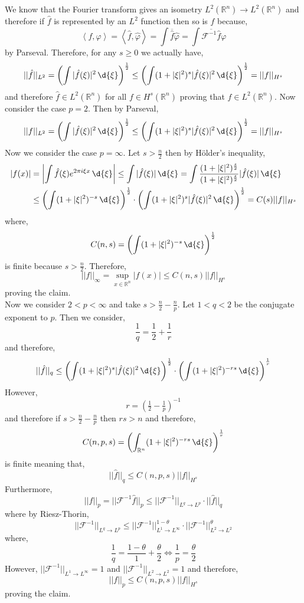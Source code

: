 \documentclass[12pt]{article}
\newcommand{\inner}[2]{\left< #1, #2 \right>}
\newcommand{\R}{\mathbb{R}}
\renewcommand{\F}{\mathcal{F}}
\begin{document}
We know that the Fourier transform gives an isometry $L^2(\R^n) \to L^2(\R^n)$ and therefore if $\hat{f}$ is represented by an $L^2$ function then so is $f$ because,
\[ \inner{f}{\varphi} = \inner{\hat{f}}{\hat{\varphi}} = \int \overline{\hat{f}} \hat{\varphi} = \int \overline{ \F^{-1} \hat{f}} \varphi \] 
by Parseval. Therefore, for any $s \ge 0$ we actually have,
\[ || \hat{f} ||_{L^2} = \left( \int | \hat{f}(\xi) |^2 \, \d{\xi} \right)^{\frac{1}{2}} \le \left( \int (1 + |\xi|^2)^s | \hat{f}(\xi) |^2 \, \d{\xi} \right)^{\frac{1}{2}} = || f ||_{H^s} \]
and therefore $\hat{f} \in L^2(\R^n)$ for all $f \in H^s(\R^n)$ proving that $f \in L^2(\R^n)$. Now consider the case $p = 2$. Then by Parseval,
\[ || f ||_{L^2} = \left( \int | \hat{f}(\xi) |^2 \, \d{\xi} \right)^{\frac{1}{2}} \le \left( \int (1 + | \xi |^2)^s | \hat{f}(\xi) |^2 \, \d{\xi} \right)^{\frac{1}{2}} = || f ||_{H^s} \]
Now we consider the case $p = \infty$. Let $s > \frac{n}{2}$ then by H\"{o}lder's inequality,
\begin{align*}
|f(x)| & = \left| \int \hat{f}(\xi) e^{2 \pi i \xi x} \, \d{\xi} \right| \le \int | \hat{f}(\xi) | \, \d{\xi} =  \int \frac{(1 + |\xi|^2)^{\frac{s}{2}}}{(1 + | \xi|^2)^{\frac{s}{2}}} | \hat{f}(\xi) | \, \d{\xi} 
\\
& \le \left( \int (1 + |\xi|^2)^{-s} \, \d{\xi} \right)^{\frac{1}{2}} \cdot \left( \int (1 + |\xi|^2)^{s} | \hat{f}(\xi)|^2 \, \d{\xi} \right)^{\frac{1}{2}} = C(s) || f ||_{H^s} 
\end{align*}
where,
\[ C(n, s) = \left( \int (1 + |\xi|^2)^{-s} \, \d{\xi} \right)^{\frac{1}{2}} \]
is finite because $s > \frac{n}{2}$. Therefore,
\[ || f ||_{\infty} = \sup_{x \in \R^n} | f(x) | \le C(n, s) || f ||_{H^s} \]
proving the claim.
\bigskip\\
Now we consider $2 < p < \infty$ and take $s > \frac{n}{2} - \frac{n}{p}$. Let $1 < q < 2$ be the conjugate exponent to $p$. Then we consider,
\[ \frac{1}{q} = \frac{1}{2} + \frac{1}{r} \]
and therefore,
\[ || \hat{f} ||_q \le \left( \int (1 + |\xi|^2)^s | \hat{f}(\xi) |^2 \, \d{\xi} \right)^{\frac{1}{2}} \cdot \left( \int (1 + | \xi |^2 )^{-rs} \, \d{\xi} \right)^{\frac{1}{r}} \]
However,
\[ r = (\tfrac{1}{2} - \tfrac{1}{p})^{-1} \]
and therefore if $s > \frac{n}{2} - \frac{n}{p}$ then $rs > n$ and therefore,
\[ C(n,p,s) = \left( \int_{\R^n} (1 + | \xi |^2 )^{-rs} \, \d{\xi} \right)^{\frac{1}{r}} \]
is finite meaning that,
\[ || \hat{f} ||_q \le C(n,p,s) || f ||_{H^s} \]
Furthermore,
\[ || f ||_p = || \F^{-1} \hat{f} ||_p \le || \F^{-1} ||_{L^q \to L^p} \cdot || \hat{f} ||_q \]
where by Riesz-Thorin,
\[ || \F^{-1} ||_{L^q \to L^p} \le || \F^{-1} ||_{L^1 \to L^\infty}^{1 - \theta} \cdot || \F^{-1} ||_{L^2 \to L^2}^\theta  \]
where,
\[ \frac{1}{q} = \frac{1 - \theta}{1} + \frac{\theta}{2} \iff \frac{1}{p} = \frac{\theta}{2} \] 
However, $|| \F^{-1} ||_{L^1 \to L^\infty} = 1$ and $|| \F^{-1} ||_{L^2 \to L^2} = 1$ and therefore,
\[ || f ||_p \le C(n,p,s) || f ||_{H^s} \]
proving the claim.
\end{document}
